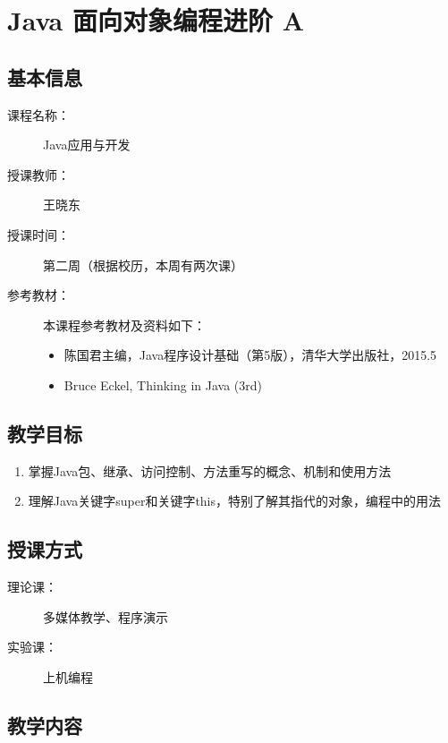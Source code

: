 \chapter{Java 面向对象编程进阶 A}
\label{chp:Advanced-object-oriented-programming}

\section*{基本信息}
\sline
\begin{description}
\item[课程名称：] Java应用与开发
\item[授课教师：] 王晓东
\item[授课时间：] 第二周（根据校历，本周有两次课）
\item[参考教材：] 本课程参考教材及资料如下：
  \begin{itemize}
  \item 陈国君主编，Java程序设计基础（第5版），清华大学出版社，2015.5
  \item Bruce Eckel, Thinking in Java (3rd)
  \end{itemize}
\end{description}

\section*{教学目标}

\sline

\begin{enumerate}
\item 掌握Java包、继承、访问控制、方法重写的概念、机制和使用方法
\item 理解Java关键字super和关键字this，特别了解其指代的对象，编程中的用法
\end{enumerate}

\section*{授课方式}

\sline
\begin{description}
\item[理论课：] 多媒体教学、程序演示
\item[实验课：] 上机编程
\end{description}

\newpage
\section*{教学内容}
\sline

